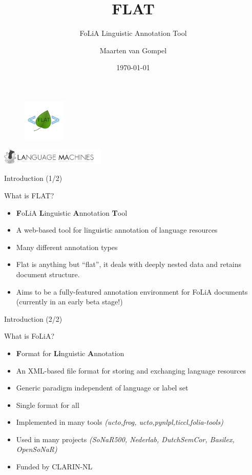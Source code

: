 \documentclass[xcolor=table,10pt,t]{beamer}
\title{FLAT}
\subtitle{FoLiA Linguistic Annotation Tool}
\date{\today}
\author{Maarten van Gompel}
\begin{document}
\begin{frame}
  \titlepage
        \begin{figure}
          \includegraphics[height=2cm]{logo.png}
        \end{figure}
        \vspace{2.5cm}
      \includegraphics[justify=left,width=5cm]{lama-logo-transparent.png}
\end{frame}







\begin{frame}{Introduction (1/2)}
  \begin{block}{What is FLAT?}
      \begin{itemize}
        \item \textbf{F}oLiA \textbf{L}inguistic \textbf{A}nnotation \textbf{T}ool
        \item A web-based tool for linguistic annotation of language resources
        \item Many different annotation types
        \item Flat is anything but ``flat'', it deals with deeply nested data
          and retains document structure.
        \item Aims to be a fully-featured annotation environment for FoLiA
          documents (currently in an early beta stage!)
      \end{itemize}
  \end{block}
\end{frame}

\begin{frame}{Introduction (2/2)}
  \begin{block}{What is FoLiA?}
    \begin{itemize}
      \item \textbf{F}ormat for \textbf{Li}nguistic \textbf{A}nnotation
      \item An XML-based file format for storing and exchanging language
        resources
      \item Generic paradigm independent of language or label set
      \item Single format for all
      \item Implemented in many tools \emph{(ucto,frog,
        ucto,pynlpl,ticcl,folia-tools)}
      \item Used in many projects \emph{(SoNaR500, Nederlab, DutchSemCor, Basilex,
        OpenSoNaR)}
      \item Funded by CLARIN-NL
    \end{itemize}
  \end{block}
\end{frame}
\end{document}
